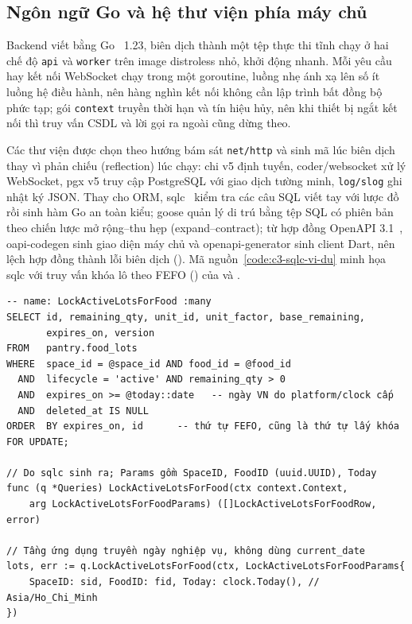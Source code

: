 \subsection{Ngôn ngữ Go và hệ thư viện phía máy chủ}\label{ssec:cn-go}

Backend viết bằng Go~\cite{golang} 1.23, biên dịch thành một tệp thực thi tĩnh chạy ở hai chế độ \texttt{api} và \texttt{worker} trên image distroless nhỏ, khởi động nhanh. Mỗi yêu cầu hay kết nối WebSocket chạy trong một goroutine, luồng nhẹ ánh xạ lên số ít luồng hệ điều hành, nên hàng nghìn kết nối không cần lập trình bất đồng bộ phức tạp; gói \texttt{context} truyền thời hạn và tín hiệu hủy, nên khi thiết bị ngắt kết nối thì truy vấn CSDL và lời gọi ra ngoài cũng dừng theo.

Các thư viện được chọn theo hướng bám sát \texttt{net/http} và sinh mã lúc biên dịch thay vì phản chiếu (reflection) lúc chạy: chi v5 định tuyến, coder/websocket xử lý WebSocket, pgx v5 truy cập PostgreSQL với giao dịch tường minh, \texttt{log/slog} ghi nhật ký JSON. Thay cho ORM, sqlc~\cite{sqlc} kiểm tra các câu SQL viết tay với lược đồ rồi sinh hàm Go an toàn kiểu; goose quản lý di trú bằng tệp SQL có phiên bản theo chiến lược mở rộng–thu hẹp (expand–contract); từ hợp đồng OpenAPI 3.1~\cite{openapi}, oapi-codegen sinh giao diện máy chủ và openapi-generator sinh client Dart, nên lệch hợp đồng thành lỗi biên dịch (). Mã nguồn~\ref{code:c3-sqlc-vi-du} minh họa sqlc với truy vấn khóa lô theo FEFO () của  và .

\begin{Verbatim}
-- name: LockActiveLotsForFood :many
SELECT id, remaining_qty, unit_id, unit_factor, base_remaining,
       expires_on, version
FROM   pantry.food_lots
WHERE  space_id = @space_id AND food_id = @food_id
  AND  lifecycle = 'active' AND remaining_qty > 0
  AND  expires_on >= @today::date   -- ngày VN do platform/clock cấp
  AND  deleted_at IS NULL
ORDER  BY expires_on, id      -- thứ tự FEFO, cũng là thứ tự lấy khóa
FOR UPDATE;

// Do sqlc sinh ra; Params gồm SpaceID, FoodID (uuid.UUID), Today
func (q *Queries) LockActiveLotsForFood(ctx context.Context,
    arg LockActiveLotsForFoodParams) ([]LockActiveLotsForFoodRow, error)

// Tầng ứng dụng truyền ngày nghiệp vụ, không dùng current_date
lots, err := q.LockActiveLotsForFood(ctx, LockActiveLotsForFoodParams{
    SpaceID: sid, FoodID: fid, Today: clock.Today(), // Asia/Ho_Chi_Minh
})
\end{Verbatim}


